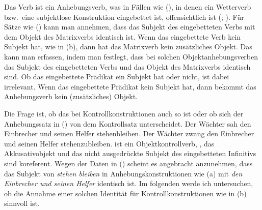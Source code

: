Das Verb  ist ein Anhebungsverb, was in Fällen wie
(), in denen ein Wetterverb bzw.\ eine subjektlose Konstruktion eingebettet
ist, offensichtlich ist (\citealp[]{Reis76c}; \citealp[]{Hoehle78a}).
\eal
{}
\zl
%
Für Sätze wie () kann man annehmen, dass das Subjekt des eingebetteten Verbs
mit dem Objekt des Matrixverbs identisch ist. Wenn das eingebettete Verb
kein Subjekt hat, wie in (b), dann hat das Matrixverb kein zusätzliches Objekt.
Das kann man erfassen, indem man festlegt, dass bei solchen Objektanhebungsverben das Subjekt
des eingebetteten Verbs und das Objekt des Matrixverbs identisch sind.
Ob das eingebettete Prädikat ein Subjekt hat oder nicht, ist dabei irrelevant.
Wenn das eingebettete Prädikat kein Subjekt hat, dann bekommt das Anhebungsverb kein
(zusätzliches) Objekt.

Die Frage ist, ob das bei Kontrollkonstruktionen auch so ist oder ob sich der Anhebungssatz in
() von dem Kontrollsatz unterscheidet.
\eal
\ex{}
Der Wächter sah den Einbrecher   und seinen Helfer stehenbleiben.
\ex{}
Der Wächter zwang den Einbrecher und seinen Helfer stehenzubleiben.
\zl
{} ist ein Objektkontrollverb, \dash, das Akkusativobjekt und das
nicht ausgedrückte Subjekt des eingebetteten Infinitivs sind koreferent.
Wegen der Daten in () scheint es angebracht anzunehmen, dass das Subjekt
von \emph{stehen bleiben} in Anhebungskonstruktionen wie (a)
mit \emph{den Einbrecher und seinen Helfer} identisch ist.
Im folgenden werde ich untersuchen, ob die Annahme einer solchen Identität für
Kontrollkonstruktionen wie in (b) sinnvoll ist.

